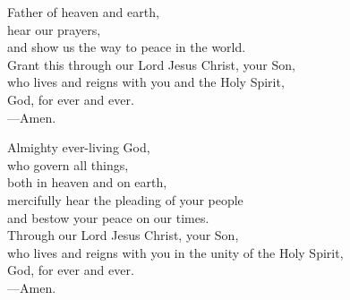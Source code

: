 \prayer


\begin{prayerverse}
Father of heaven and earth,\\
hear our prayers,\\
and show us the way to peace in the world.\\
Grant this through our Lord Jesus Christ, your Son,\\
who lives and reigns with you and the Holy Spirit,\\
God, for ever and ever.\\
{\color{red}---\thinspace}Amen.
\end{prayerverse}


\begin{prayerverse}
Almighty ever-living God,\\
who govern all things,\\
both in heaven and on earth,\\
mercifully hear the pleading of your people\\
and bestow your peace on our times.\\
Through our Lord Jesus Christ, your Son,\\
who lives and reigns with you in the unity of the Holy Spirit,\\
God, for ever and ever.\\
{\color{red}---\thinspace}Amen.
\end{prayerverse}

